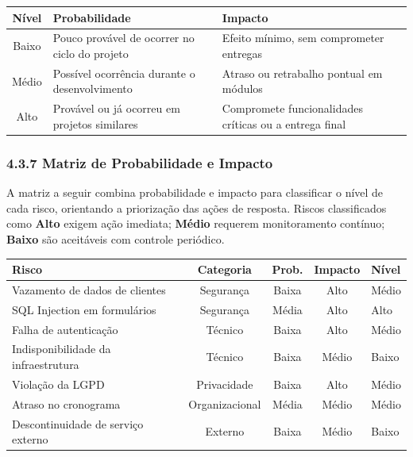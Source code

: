 \documentclass[12pt, a4paper]{article}
\begin{document}
\vspace{6pt}
\noindent
\renewcommand{\arraystretch}{1.4}
\begin{tabular}{|c|p{5.5cm}|p{5.5cm}|}
\hline
\textbf{N\'ivel} & \textbf{Probabilidade} & \textbf{Impacto} \\
\hline
Baixo & Pouco prov\'avel de ocorrer no ciclo do projeto & Efeito m\'inimo, sem comprometer entregas \\
\hline
M\'edio & Poss\'ivel ocorr\^encia durante o desenvolvimento & Atraso ou retrabalho pontual em m\'odulos \\
\hline
Alto & Prov\'avel ou j\'a ocorreu em projetos similares & Compromete funcionalidades cr\'iticas ou a entrega final \\
\hline
\end{tabular}
 
\subsubsection*{4.3.7 Matriz de Probabilidade e Impacto}
 
A matriz a seguir combina probabilidade e impacto para classificar o n\'ivel de cada risco,
orientando a prioriza\c{c}\~ao das a\c{c}\~oes de resposta. Riscos classificados como
\textbf{Alto} exigem a\c{c}\~ao imediata; \textbf{M\'edio} requerem monitoramento cont\'inuo;
\textbf{Baixo} s\~ao aceit\'aveis com controle peri\'odico.
 
\vspace{6pt}
\noindent
\renewcommand{\arraystretch}{1.4}
\begin{tabular}{|p{4.2cm}|c|c|c|p{3.8cm}|}
\hline
\textbf{Risco} & \textbf{Categoria} & \textbf{Prob.} & \textbf{Impacto} & \textbf{N\'ivel} \\
\hline
Vazamento de dados de clientes & Seguran\c{c}a & Baixa & Alto & M\'edio \\
\hline
SQL Injection em formul\'arios & Seguran\c{c}a & M\'edia & Alto & Alto \\
\hline
Falha de autentica\c{c}\~ao & T\'ecnico & Baixa & Alto & M\'edio \\
\hline
Indisponibilidade da infraestrutura & T\'ecnico & Baixa & M\'edio & Baixo \\
\hline
Viola\c{c}\~ao da LGPD & Privacidade & Baixa & Alto & M\'edio \\
\hline
Atraso no cronograma & Organizacional & M\'edia & M\'edio & M\'edio \\
\hline
Descontinuidade de servi\c{c}o externo & Externo & Baixa & M\'edio & Baixo \\
\hline
\end{tabular}
 
\end{document}
